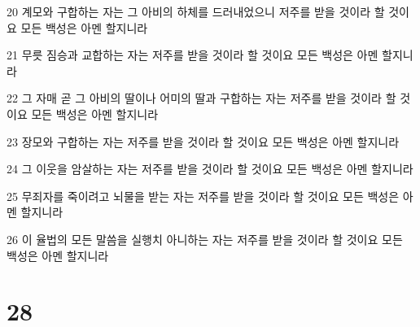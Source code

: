 \par 20 계모와 구합하는 자는 그 아비의 하체를 드러내었으니 저주를 받을 것이라 할 것이요 모든 백성은 아멘 할지니라
\par 21 무릇 짐승과 교합하는 자는 저주를 받을 것이라 할 것이요 모든 백성은 아멘 할지니라
\par 22 그 자매 곧 그 아비의 딸이나 어미의 딸과 구합하는 자는 저주를 받을 것이라 할 것이요 모든 백성은 아멘 할지니라
\par 23 장모와 구합하는 자는 저주를 받을 것이라 할 것이요 모든 백성은 아멘 할지니라
\par 24 그 이웃을 암살하는 자는 저주를 받을 것이라 할 것이요 모든 백성은 아멘 할지니라
\par 25 무죄자를 죽이려고 뇌물을 받는 자는 저주를 받을 것이라 할 것이요 모든 백성은 아멘 할지니라
\par 26 이 율법의 모든 말씀을 실행치 아니하는 자는 저주를 받을 것이라 할 것이요 모든 백성은 아멘 할지니라

\chapter{28}

